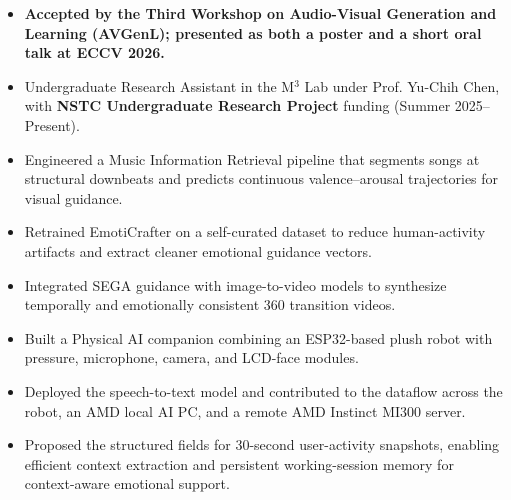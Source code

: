 \documentclass[10pt,a4paper,ragged2e,withhyper,normalphoto]{altacv}
\begin{document}
\begin{fullwidth}

\begin{itemize}
  \item \textbf{Accepted by the Third Workshop on Audio-Visual Generation and Learning (AVGenL); presented as both a poster and a short oral talk at ECCV 2026.}
  \item Undergraduate Research Assistant in the M$^3$ Lab under Prof. Yu-Chih Chen, with \textbf{NSTC Undergraduate Research Project} funding (Summer 2025--Present).
  \item Engineered a Music Information Retrieval pipeline that segments songs at structural downbeats and predicts continuous valence--arousal trajectories for visual guidance.
  \item Retrained EmotiCrafter on a self-curated dataset to reduce human-activity artifacts and extract cleaner emotional guidance vectors.
  \item Integrated SEGA guidance with image-to-video models to synthesize temporally and emotionally consistent 360\textdegree{} transition videos.
\end{itemize}


\begin{itemize}
  \item Built a Physical AI companion combining an ESP32-based plush robot with pressure, microphone, camera, and LCD-face modules.
  \item Deployed the speech-to-text model and contributed to the dataflow across the robot, an AMD local AI PC, and a remote AMD Instinct MI300 server.
  \item Proposed the structured fields for 30-second user-activity snapshots, enabling efficient context extraction and persistent working-session memory for context-aware emotional support.
\end{itemize}


\end{fullwidth}
\end{document}
